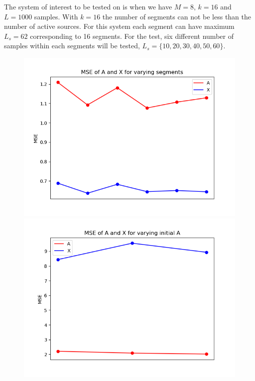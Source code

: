 The system of interest to be tested on is when we have $M = 8$, $k = 16$ and $L = 1000$ samples. With $k = 16$ the number of segments can not be less than the number of active sources. For this system each segment can have maximum $L_s = 62$ corresponding to 16 segments. 
For the test, six different number of samples within each segments will be tested, $L_s = \{ 10, 20, 30, 40, 50, 60 \}$.
\begin{figure}[H]
\centering
    \begin{minipage}[t]{.45\textwidth}
        \centering
		\includegraphics[scale=0.5]{figures/chapter6/Mix_Error_vary_covseg_m8_k16_L1000}
    \end{minipage} 
    \hfill
    \begin{minipage}[t]{.45\textwidth}
        \centering
		\includegraphics[scale=0.5]{figures/chapter6/AR_Error_initial_A_m8_k16_L1000.png}

\end{minipage}
\end{figure}

